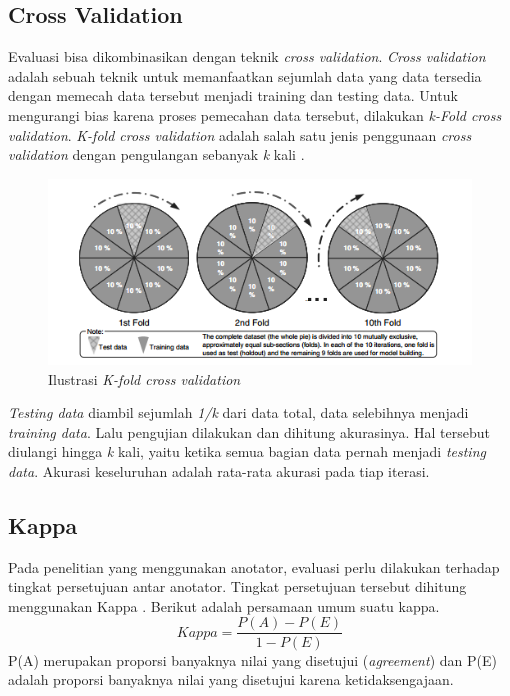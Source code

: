 	\subsection{Cross Validation}
	Evaluasi bisa dikombinasikan dengan teknik \textit{cross validation}. \textit{Cross validation} adalah sebuah teknik untuk memanfaatkan sejumlah data yang data tersedia dengan memecah data tersebut menjadi training dan testing data. Untuk mengurangi bias karena proses pemecahan data tersebut, dilakukan \textit{k-Fold cross validation}. \textit{K-fold cross validation} adalah salah satu jenis penggunaan \textit{cross validation} dengan pengulangan sebanyak \textit{k} kali \citep{olson2008advanced}. 
	\begin{figure}
		\centering
		\includegraphics[width=0.7\linewidth]{pics/cv}
		\caption{Ilustrasi \textit{K-fold cross validation} \citep{olson2008advanced}}
		\label{fig:cv}
	\end{figure}
	\textit{Testing data} diambil sejumlah \textit{1/k} dari data total, data selebihnya menjadi \textit{training data}. Lalu pengujian dilakukan dan dihitung akurasinya. Hal tersebut diulangi hingga \textit{k} kali, yaitu ketika semua bagian data pernah menjadi \textit{testing data}. Akurasi keseluruhan adalah rata-rata akurasi pada tiap iterasi.
	
	
	
	\subsection{Kappa}
	Pada penelitian yang menggunakan anotator, evaluasi perlu dilakukan terhadap tingkat persetujuan antar anotator. Tingkat persetujuan tersebut dihitung menggunakan Kappa \citep{Manning:2008:IIR:1394399}. Berikut adalah persamaan umum suatu kappa.
	\begin{equation}
	Kappa = \frac{P(A)-P(E)}{1-P(E)}
	\end{equation}
	\noindent P(A) merupakan proporsi banyaknya nilai yang disetujui (\textit{agreement}) dan P(E) adalah proporsi banyaknya nilai yang disetujui karena ketidaksengajaan. 
	
